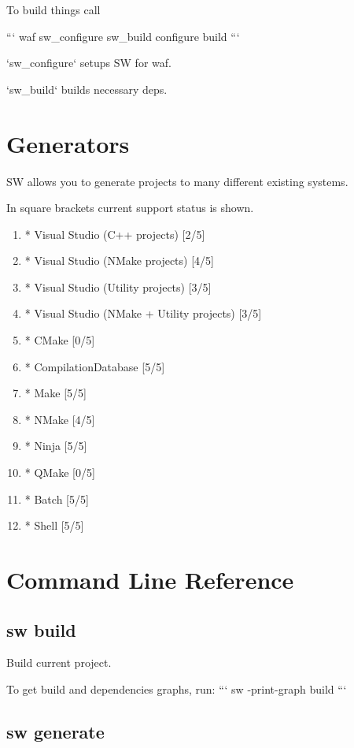 To build things call

```
waf sw_configure sw_build configure build
```

`sw_configure` setups SW for waf.

`sw_build` builds necessary deps.





\section{Generators}

SW allows you to generate projects to many different existing systems.

In square brackets current support status is shown.

\begin{enumerate}
\item
* Visual Studio (C++ projects) [2/5]
\item
* Visual Studio (NMake projects) [4/5]
\item
* Visual Studio (Utility projects) [3/5]
\item
* Visual Studio (NMake + Utility projects) [3/5]
\item
* CMake [0/5]
\item
* CompilationDatabase [5/5]
\item
* Make [5/5]
\item
* NMake [4/5]
\item
* Ninja [5/5]
\item
* QMake [0/5]
\item
* Batch [5/5]
\item
* Shell [5/5]
\end{enumerate}


\section{Command Line Reference}

\subsection{sw build}

Build current project.

To get build and dependencies graphs, run:
```
sw -print-graph build
```

\subsection{sw generate}


